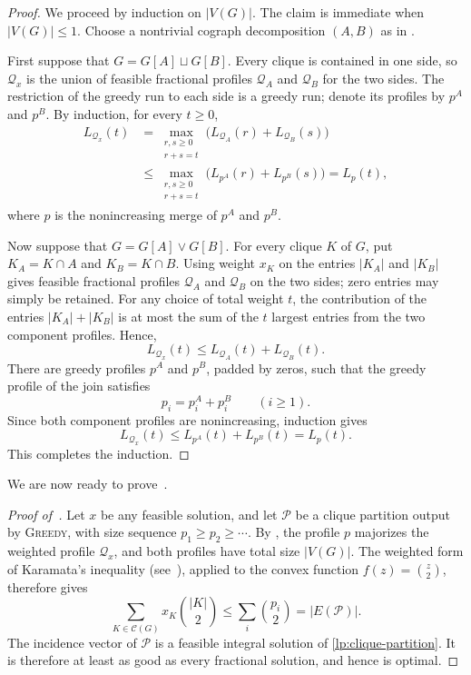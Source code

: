 \documentclass[a4paper,fleqn]{cas-sc}
\theoremstyle{remark}
\theoremstyle{plain}
\newcommand{\greedy}{{\textsc{Greedy}}}
\begin{document}
\begin{proof}
We proceed by induction on $|V(G)|$. The claim is immediate when
$|V(G)|\leq1$. Choose a nontrivial cograph decomposition $(A,B)$ as
in .

First suppose that $G=G[A]\sqcup G[B]$. Every clique is contained in
one side, so $\mathcal{Q}_x$ is the union of feasible fractional
profiles $\mathcal{Q}_A$ and $\mathcal{Q}_B$ for the two sides. The
restriction of the greedy run to each side is a greedy run; denote its
profiles by $p^A$ and $p^B$. By induction, for every $t\geq0$,
\[
\begin{aligned}
L_{\mathcal{Q}_x}(t)
 &=\max_{\substack{r,s\geq0\\r+s=t}}
     \bigl(L_{\mathcal{Q}_A}(r)+L_{\mathcal{Q}_B}(s)\bigr)\\
 &\leq\max_{\substack{r,s\geq0\\r+s=t}}
     \bigl(L_{p^A}(r)+L_{p^B}(s)\bigr)
 =L_p(t),
\end{aligned}
\]
where $p$ is the nonincreasing merge of $p^A$ and $p^B$.

Now suppose that $G=G[A]\vee G[B]$. For every clique $K$ of $G$, put
$K_A=K\cap A$ and $K_B=K\cap B$. Using weight $x_K$ on the entries
$|K_A|$ and $|K_B|$ gives feasible fractional profiles
$\mathcal{Q}_A$ and $\mathcal{Q}_B$ on the two sides; zero entries may
simply be retained. For any choice of total weight $t$, the contribution
of the entries $|K_A|+|K_B|$ is at most the sum of the $t$ largest
entries from the two component profiles. Hence,
\[
L_{\mathcal{Q}_x}(t)
\leq L_{\mathcal{Q}_A}(t)+L_{\mathcal{Q}_B}(t).
\]
There are greedy profiles $p^A$ and $p^B$, padded by zeros, such that
the greedy profile of the join satisfies
\[
p_i=p^A_i+p^B_i\qquad(i\geq1).
\]
Since both component profiles are nonincreasing, induction gives
\[
L_{\mathcal{Q}_x}(t)
\leq L_{p^A}(t)+L_{p^B}(t)
=L_p(t).
\]
This completes the induction.
\end{proof}

We are now ready to prove~.

\begin{proof}[Proof of~]
Let $x$ be any feasible solution, and let $\mathcal{P}$ be a clique
partition output by \greedy{}, with size sequence
$p_1\geq p_2\geq\cdots$. By
, the
profile $p$ majorizes the weighted profile $\mathcal{Q}_x$, and both
profiles have total size $|V(G)|$. The weighted form of Karamata's
inequality (see~\cite{MOA11}), applied to the convex function
$f(z)=\binom{z}{2}$, therefore gives
\[
\sum_{K\in\mathcal{C}(G)}x_K\binom{|K|}{2}
\leq \sum_i\binom{p_i}{2}
=|E(\mathcal{P})|.
\]
The incidence vector of $\mathcal{P}$ is a feasible integral solution
of \eqref{lp:clique-partition}. It is therefore at least as good as
every fractional solution, and hence is optimal.
\end{proof}
\end{document}
